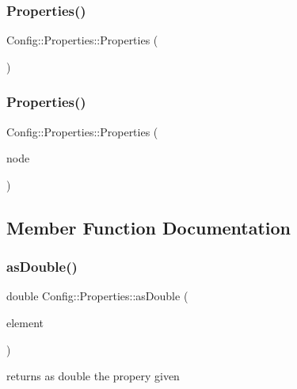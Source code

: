 \subsubsection{\texorpdfstring{Properties()}{Properties()}\hspace{0.1cm}{\footnotesize\ttfamily [1/2]}}
{\footnotesize\ttfamily Config\+::\+Properties\+::\+Properties (\begin{DoxyParamCaption}{ }\end{DoxyParamCaption})}

\mbox{\label{class_config_1_1_properties_a78be1d1646141b99664c418744c6ec0d}} 
\subsubsection{\texorpdfstring{Properties()}{Properties()}\hspace{0.1cm}{\footnotesize\ttfamily [2/2]}}
{\footnotesize\ttfamily Config\+::\+Properties\+::\+Properties (\begin{DoxyParamCaption}\item[{Y\+A\+M\+L\+::\+Node}]{node }\end{DoxyParamCaption})}



\subsection{Member Function Documentation}
\mbox{\label{class_config_1_1_properties_a5577e668732a41e58b9852cb59f4400b}} 
\subsubsection{\texorpdfstring{as\+Double()}{asDouble()}}
{\footnotesize\ttfamily double Config\+::\+Properties\+::as\+Double (\begin{DoxyParamCaption}\item[{std\+::string}]{element }\end{DoxyParamCaption})}



returns as double the propery given 


